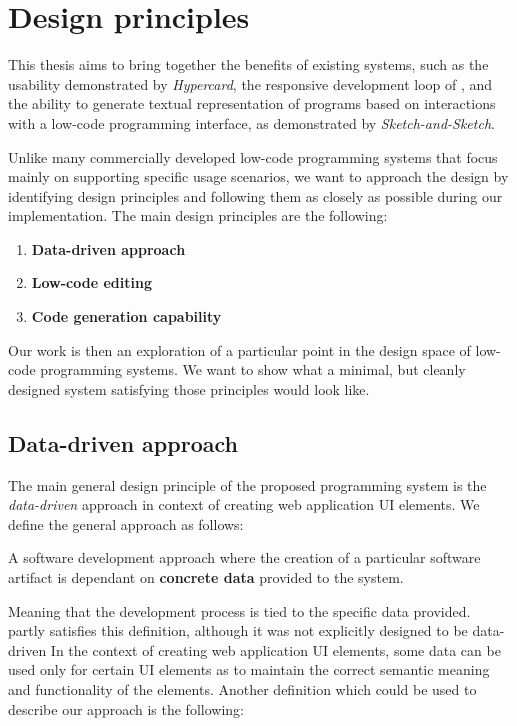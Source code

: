 \chapter{Design principles}
\label{chap:design}
This thesis aims to bring together the benefits of existing systems, such as the usability demonstrated by \emph{Hypercard},
the responsive development loop of \citet{darklang}, and the ability to generate textual representation of programs based on
interactions with a low-code programming interface, as demonstrated by \emph{Sketch-and-Sketch}\cite{sketch-and-sketch}.

Unlike many commercially developed low-code programming systems that focus mainly on supporting specific usage scenarios,
we want to approach the design by identifying design principles and following them as closely as possible during our implementation.
The main design principles are the following:
\begin{enumerate}
	\item \textbf{Data-driven approach}
	\item \textbf{Low-code editing}
	\item \textbf{Code generation capability}
\end{enumerate}

Our work is then an exploration of a particular point in the design space of low-code programming systems.
We want to show what a minimal, but cleanly designed system satisfying those principles would look like.

\section{Data-driven approach}

The main general design principle of the proposed programming system is the \emph{data-driven} approach in context of creating web application UI elements.
We define the general approach as follows:
\begin{defn}
	A software development approach where the creation of a particular software artifact is dependant on \textbf{concrete data} provided to the system.
\end{defn}

Meaning that the development process is tied to the specific data provided.
\citet{darklang} partly satisfies this definition, although it was not explicitly designed to be data-driven
In the context of creating web application UI elements, some data can be used only for certain UI elements as to maintain the correct semantic meaning and functionality of the elements.
Another definition which could be used to describe our approach is the following:

